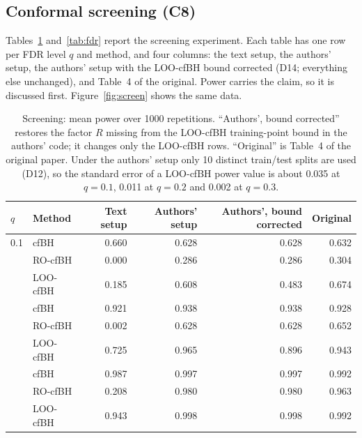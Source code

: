 \subsection{Conformal screening (C8)}

Tables~\ref{tab:power} and~\ref{tab:fdr} report the screening experiment. Each table has one row per FDR level $q$ and
method, and four columns: the text setup, the authors' setup, the authors' setup with the LOO-cfBH bound corrected
(D14; everything else unchanged), and Table~4 of the original. Power carries the claim, so it is discussed first.
Figure~\ref{fig:screen} shows the same data.

\begin{table}[htbp]
\centering\small
\caption{Screening: mean power over 1000 repetitions. ``Authors', bound corrected'' restores the factor $R$ missing
from the LOO-cfBH training-point bound in the authors' code; it changes only the LOO-cfBH rows. ``Original'' is
Table~4 of the original paper. Under the authors' setup only 10 distinct train/test splits are used (D12), so the
standard error of a LOO-cfBH power value is about 0.035 at $q=0.1$, 0.011 at $q=0.2$ and 0.002 at $q=0.3$.}
\label{tab:power}
\begin{tabular}{@{}llrrrr@{}}
\toprule
$q$ & Method & Text setup & Authors' setup & Authors', bound corrected & Original \\
\midrule
0.1 & cfBH & 0.660 & 0.628 & 0.628 & 0.632 \\
 & RO-cfBH & 0.000 & 0.286 & 0.286 & 0.304 \\
 & LOO-cfBH & 0.185 & 0.608 & 0.483 & 0.674 \\
\addlinespace
0.2 & cfBH & 0.921 & 0.938 & 0.938 & 0.928 \\
 & RO-cfBH & 0.002 & 0.628 & 0.628 & 0.652 \\
 & LOO-cfBH & 0.725 & 0.965 & 0.896 & 0.943 \\
\addlinespace
0.3 & cfBH & 0.987 & 0.997 & 0.997 & 0.992 \\
 & RO-cfBH & 0.208 & 0.980 & 0.980 & 0.963 \\
 & LOO-cfBH & 0.943 & 0.998 & 0.998 & 0.992 \\
\bottomrule
\end{tabular}
\end{table}

